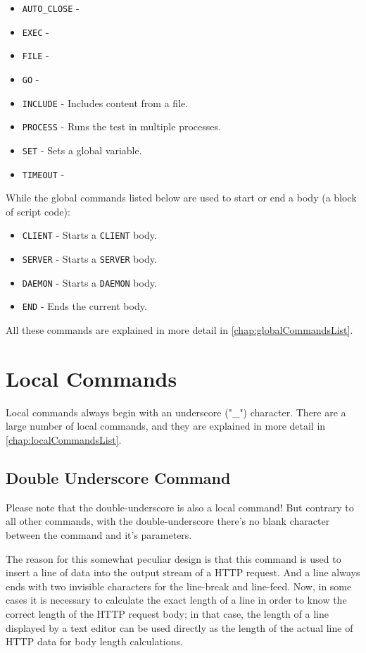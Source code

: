 \begin{itemize}
\item \texttt{AUTO\_CLOSE} - 
\item \texttt{EXEC} - 
\item \texttt{FILE} - 
\item \texttt{GO} - 
\item \texttt{INCLUDE} - Includes content from a file.
\item \texttt{PROCESS} - Runs the test in multiple processes.
\item \texttt{SET} - Sets a global variable.
\item \texttt{TIMEOUT} - 
\end{itemize}

While the global commands listed below are used to start or end 
a body (a block of script code):

\begin{itemize}
\item \texttt{CLIENT} - Starts a \texttt{CLIENT} body.
\item \texttt{SERVER} - Starts a \texttt{SERVER} body.
\item \texttt{DAEMON} - Starts a \texttt{DAEMON} body.
\item \texttt{END} - Ends the current body.
\end{itemize}

All these commands are explained in more detail in \ref{chap:globalCommandsList}.


\newpage
\section{Local Commands}
\label{chap:localCommands}

Local commands always begin with an underscore ("\_") character. There are a 
large number of local commands, and they are explained in more detail in \ref{chap:localCommandsList}.

\subsection{Double Underscore Command} 

Please note that the double-underscore is also a local command! But contrary to 
all other commands, with the double-underscore there's no blank character between 
the command and it's parameters.

The reason for this somewhat peculiar design is that this command is used to 
insert a line of data into the output stream of a HTTP request. And a line always 
ends with two invisible characters for the line-break and line-feed. Now, in some 
cases it is necessary to calculate the exact length of a line in order to know the 
correct length of the HTTP request body; in that case, the length of a line 
displayed by a text editor can be used directly as the length of the actual line 
of HTTP data for body length calculations.
